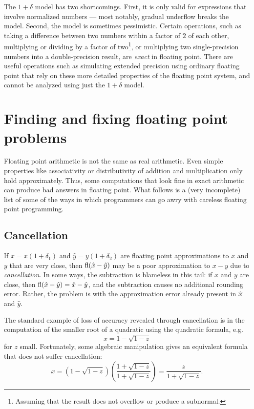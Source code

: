 \documentclass[12pt, leqno]{article} %
\begin{document}
The $1+\delta$ model has two shortcomings.  First, it is only valid
for expressions that involve normalized numbers --- most notably,
gradual underflow breaks the model.  Second, the model is sometimes
pessimistic.  Certain operations, such as taking a difference between
two numbers within a factor of $2$ of each other, multiplying or
dividing by a factor of two\footnote{Assuming that the result
does not overflow or produce a subnormal.}, or multiplying two
single-precision numbers into a double-precision result,
are {\em exact} in floating point.  There are useful operations
such as simulating extended precision using ordinary floating point
that rely on these more detailed properties of the floating point system,
and cannot be analyzed using just the $1+\delta$ model.

\section{Finding and fixing floating point problems}

Floating point arithmetic is not the same as real arithmetic.  Even
simple properties like associativity or distributivity of addition and
multiplication only hold approximately.  Thus, some computations that
look fine in exact arithmetic can produce bad answers in floating
point.  What follows is a (very incomplete) list of some of the ways
in which programmers can go awry with careless floating point
programming.

\subsection{Cancellation}

If $\hat{x} = x(1+\delta_1)$ and $\hat{y} = y(1+\delta_2)$ are
floating point approximations to $x$ and $y$ that are very close, then
$\operatorname{fl}(\hat{x}-\hat{y})$ may be a poor approximation to $x-y$ due to
{\em cancellation}.  In some ways, the subtraction is blameless in
this tail: if $x$ and $y$ are close, then $\operatorname{fl}(\hat{x}-\hat{y}) =
\hat{x}-\hat{y}$, and the subtraction causes no additional rounding
error.  Rather, the problem is with the approximation error already
present in $\hat{x}$ and $\hat{y}$.

The standard example of loss of accuracy revealed through cancellation
is in the computation of the smaller root of a quadratic using the
quadratic formula, e.g.
\[
  x = 1-\sqrt{1-z}
\]
for $z$ small.  Fortunately, some algebraic manipulation gives an
equivalent formula that does not suffer cancellation:
\[
  x =
    \left( 1-\sqrt{1-z} \right)
    \left(\frac{1+\sqrt{1-z}}{1+\sqrt{1-z}}\right)
  =
    \frac{z}{1+\sqrt{1-z}}.
\]
\end{document}
